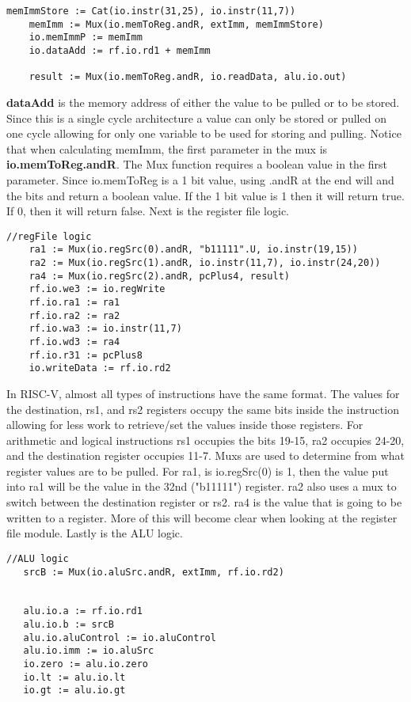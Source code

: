 \documentclass[12pt, letterpaper]{report}
\begin{document}
\begin{lstlisting}[style=scala]
    memImmStore := Cat(io.instr(31,25), io.instr(11,7))
    memImm := Mux(io.memToReg.andR, extImm, memImmStore)
    io.memImmP := memImm
    io.dataAdd := rf.io.rd1 + memImm
    
    result := Mux(io.memToReg.andR, io.readData, alu.io.out)
\end{lstlisting}

\textbf{dataAdd} is the memory address of either the value to be pulled or to be stored. Since this is a single
cycle architecture a value can only be stored or pulled on one cycle allowing for only one variable to be used for
storing and pulling. Notice that when calculating memImm, the first parameter in the mux is 
\textbf{io.memToReg.andR}. The Mux function requires a boolean value in the first parameter. Since io.memToReg is
a 1 bit value, using .andR at the end will and the bits and return a boolean value. If the 1 bit value is 1 then 
it will return true. If 0, then it will return false. Next is the register file logic. 

\begin{lstlisting}[style=scala]
    //regFile logic
    ra1 := Mux(io.regSrc(0).andR, "b11111".U, io.instr(19,15))
    ra2 := Mux(io.regSrc(1).andR, io.instr(11,7), io.instr(24,20))
    ra4 := Mux(io.regSrc(2).andR, pcPlus4, result)
    rf.io.we3 := io.regWrite
    rf.io.ra1 := ra1
    rf.io.ra2 := ra2
    rf.io.wa3 := io.instr(11,7)
    rf.io.wd3 := ra4
    rf.io.r31 := pcPlus8
    io.writeData := rf.io.rd2
\end{lstlisting}

In RISC-V, almost all types of instructions have the same format. The values for the destination, rs1, and rs2 registers occupy the same
bits inside the instruction allowing for less work to retrieve/set the values inside those registers. For arithmetic and logical instructions
rs1 occupies the bits 19-15, ra2 occupies 24-20, and the destination register occupies 11-7. Muxs are used to determine from what register values
are to be pulled. For ra1, is io.regSrc(0) is 1, then the value put into ra1 will be the value in the 32nd ("b11111") register. ra2 also uses a mux
to switch between the destination register or rs2. ra4 is the value that is going to be written to a register. More of this will become clear when
looking at the register file module. Lastly is the ALU logic. 

\begin{lstlisting}[style=scala]
   //ALU logic
   srcB := Mux(io.aluSrc.andR, extImm, rf.io.rd2)

   
   alu.io.a := rf.io.rd1
   alu.io.b := srcB
   alu.io.aluControl := io.aluControl
   alu.io.imm := io.aluSrc
   io.zero := alu.io.zero
   io.lt := alu.io.lt
   io.gt := alu.io.gt
\end{lstlisting}
\end{document}
